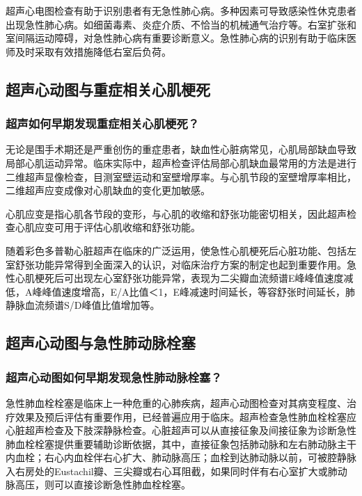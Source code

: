 超声心电图检查有助于识别患者有无急性肺心病。多种因素可导致感染性休克患者出现急性肺心病。如细菌毒素、炎症介质、不恰当的机械通气治疗等。右室扩张和室间隔运动障碍，对急性肺心病有重要诊断意义。急性肺心病的识别有助于临床医师及时采取有效措施降低右室后负荷。

\subsection{超声心动图与重症相关心肌梗死}

\subsubsection{超声如何早期发现重症相关心肌梗死？}

无论是围手术期还是严重创伤的重症患者，缺血性心脏病常见，心肌局部缺血导致局部心肌运动异常。临床实际中，超声检查评估局部心肌缺血最常用的方法是进行二维超声显像检查，目测室壁运动和室壁增厚率。与心肌节段的室壁增厚率相比，二维超声应变成像对心肌缺血的变化更加敏感。

心肌应变是指心肌各节段的变形，与心肌的收缩和舒张功能密切相关，因此超声检查心肌应变可用于评估心肌收缩和舒张功能。

随着彩色多普勒心脏超声在临床的广泛运用，使急性心肌梗死后心脏功能、包括左室舒张功能异常得到全面深入的认识，对临床治疗方案的制定也起到重要作用。急性心肌梗死后可出现左心室舒张功能异常，表现为二尖瓣血流频谱E峰峰值速度减低，A峰峰值速度增高，E/A比值＜1，E峰减速时间延长，等容舒张时间延长，肺静脉血流频谱S/D峰值比值增加等。

\subsection{超声心动图与急性肺动脉栓塞}

\subsubsection{超声心动图如何早期发现急性肺动脉栓塞？}

急性肺血栓栓塞是临床上一种危重的心肺疾病，超声心动图检查对其病变程度、治疗效果及预后评估有重要作用，已经普遍应用于临床。超声检查急性肺血栓栓塞应心脏超声检查及下肢深静脉检查。心脏超声可以从直接征象及间接征象为诊断急性肺血栓栓塞提供重要辅助诊断依据，其中，直接征象包括肺动脉和左右肺动脉主干内血栓；右心内血栓伴右心扩大、肺动脉高压；血栓到达肺动脉以前，可被腔静脉入右房处的Eustachil瓣、三尖瓣或右心耳阻截，如果同时伴有右心室扩大或肺动脉高压，则可以直接诊断急性肺血栓栓塞。

